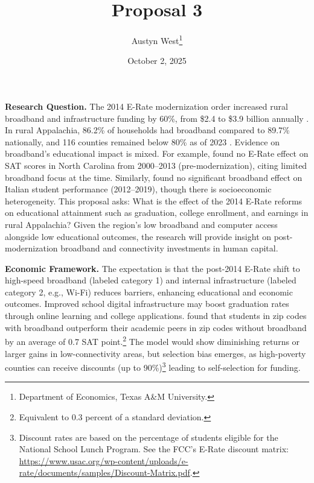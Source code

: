 


\begin{singlespace}
\title{Proposal 3}
\author{Austyn West\thanks{Department of Economics, Texas A\&M University.}}
\date{October 2, 2025}
\maketitle
\end{singlespace}

\textbf{Research Question.}  The 2014 E-Rate modernization order increased rural broadband and infrastructure funding by 60\%, from \$2.4 to \$3.9 billion annually \citep{federalcommunicationscommisionSummarySecondERate}. In rural Appalachia, 86.2\% of households had broadband compared to 89.7\% nationally, and 116 counties remained below 80\% as of 2023 \citep{srygleyAPPALACHIANREGIONDATA}. Evidence on broadband’s educational impact is mixed. For example, \cite{hazlettEducationalImpactBroadband2019} found no E-Rate effect on SAT scores in North Carolina from 2000–2013 (pre-modernization), citing limited broadband focus at the time. Similarly, \cite{boeriHighSpeedBroadbandSchool2023} found no significant broadband effect on Italian student performance (2012–2019), though there is socioeconomic heterogeneity. This proposal asks: What is the effect of the 2014 E-Rate reforms on educational attainment such as graduation, college enrollment, and earnings in rural Appalachia? Given the region’s low broadband and computer access alongside low educational outcomes, the research will provide insight on post-modernization broadband and connectivity investments in human capital.

\textbf{Economic Framework.} The expectation is that the post-2014 E-Rate shift to high-speed broadband (labeled category 1) and internal infrastructure (labeled category 2, e.g., Wi-Fi) reduces barriers, enhancing educational and economic outcomes. Improved school digital infrastructure may boost graduation rates through online learning and college applications. \cite{dettlingEveryLittleBit2015} found that students in zip codes with broadband outperform their academic peers in zip codes without broadband by an average of 0.7 SAT point.\footnote{Equivalent to 0.3 percent of a standard deviation.} The model would show diminishing returns or larger gains in low-connectivity areas, but selection bias emerges, as high-poverty counties can receive discounts (up to 90\%)\footnote{Discount rates are based on the percentage of students eligible for the National School Lunch Program. See the FCC’s E-Rate discount matrix: \url{https://www.usac.org/wp-content/uploads/e-rate/documents/samples/Discount-Matrix.pdf}.} leading to self-selection for funding.  

